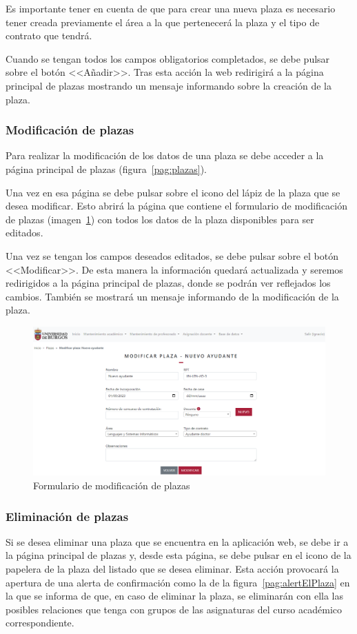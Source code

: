 Es importante tener en cuenta de que para crear una nueva plaza es necesario tener creada previamente el área a la que pertenecerá la plaza y el tipo de contrato que tendrá.

Cuando se tengan todos los campos obligatorios completados, se debe pulsar sobre el botón <<Añadir>>.
Tras esta acción la web redirigirá a la página principal de plazas mostrando un mensaje informando sobre la creación de la plaza.

\subsubsection{Modificación de plazas}
Para realizar la modificación de los datos de una plaza se debe acceder a la página principal de plazas (figura~\ref{pag:plazas}).

Una vez en esa página se debe pulsar sobre el icono del lápiz de la plaza que se desea modificar.
Esto abrirá la página que contiene el formulario de modificación de plazas (imagen~\ref{pag:formModPlaza}) con todos los datos de la plaza disponibles para ser editados.

Una vez se tengan los campos deseados editados, se debe pulsar sobre el botón <<Modificar>>.
De esta manera la información quedará actualizada y seremos redirigidos a la página principal de plazas, donde se podrán ver reflejados los cambios. 
También se mostrará un mensaje informando de la modificación de la plaza.

\begin{figure}
	\centering
	\includegraphics[width=\textwidth]{../img/Anexos/Manual usuario/formModPlaza.png}
	\caption{Formulario de modificación de plazas}\label{pag:formModPlaza}
\end{figure}

\subsubsection{Eliminación de plazas}
Si se desea eliminar una plaza que se encuentra en la aplicación web, se debe ir a la página principal de plazas y, desde esta página, se debe pulsar en el icono de la papelera de la plaza del listado que se desea eliminar.
Esta acción provocará la apertura de una alerta de confirmación como la de la figura~\ref{pag:alertElPlaza} en la que se informa de que, en caso de eliminar la plaza, se eliminarán con ella las posibles relaciones que tenga con grupos de las asignaturas del curso académico correspondiente.

